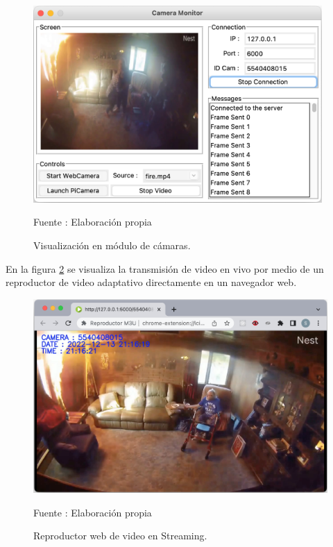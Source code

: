 \begin{figure}[H]
    \begin{center}
        \includegraphics[width=11cm]{img/capitulo_6/stream.png}
    \end{center}
    \begin{center}
        \caption{Visualización en módulo de cámaras.}
        Fuente : Elaboración propia
        \label{mod_camera_stream}
    \end{center}
\end{figure}

En la figura \ref{stream_chrome} se visualiza la transmisión de video en vivo por medio de un reproductor de video adaptativo directamente en un navegador web.

\begin{figure}[H]
    \begin{center}
        \includegraphics[width=15cm]{img/capitulo_6/stream_web.png}
    \end{center}
    \begin{center}
        \caption{Reproductor web de video en Streaming.}
        Fuente : Elaboración propia
        \label{stream_chrome}
    \end{center}
\end{figure}

